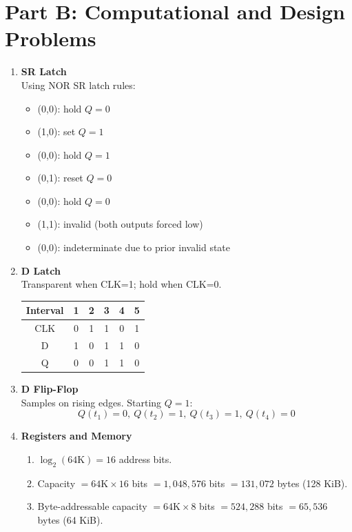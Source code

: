 \documentclass[11pt]{article}
\begin{document}
\section*{Part B: Computational and Design Problems}
\begin{enumerate}[label=\textbf{B\arabic*.}]
  \item \textbf{SR Latch}\\
  Using NOR SR latch rules:
  \begin{itemize}[leftmargin=*]
    \item (0,0): hold $Q=0$
    \item (1,0): set $Q=1$
    \item (0,0): hold $Q=1$
    \item (0,1): reset $Q=0$
    \item (0,0): hold $Q=0$
    \item (1,1): invalid (both outputs forced low)
    \item (0,0): indeterminate due to prior invalid state
  \end{itemize}

  \item \textbf{D Latch}\\
  Transparent when CLK=1; hold when CLK=0.
  \begin{center}
  \begin{tabular}{c|ccccc}
  Interval & 1 & 2 & 3 & 4 & 5 \\ \hline
  CLK & 0 & 1 & 1 & 0 & 1 \\
  D   & 1 & 0 & 1 & 1 & 0 \\
  Q   & 0 & 0 & 1 & 1 & 0 \\
  \end{tabular}
  \end{center}

  \item \textbf{D Flip-Flop}\\
  Samples on rising edges. Starting $Q=1$:
  \[
  Q(t_1)=0,\ Q(t_2)=1,\ Q(t_3)=1,\ Q(t_4)=0
  \]

  \item \textbf{Registers and Memory}\\
  \begin{enumerate}[label=(\alph*)]
    \item $\log_2(64\text{K})=16$ address bits.
    \item Capacity $= 64\text{K} \times 16$ bits $= 1,048,576$ bits $= 131,072$ bytes (128 KiB).
    \item Byte-addressable capacity $= 64\text{K} \times 8$ bits $= 524,288$ bits $= 65,536$ bytes (64 KiB).
  \end{enumerate}


\end{enumerate}
\end{document}
